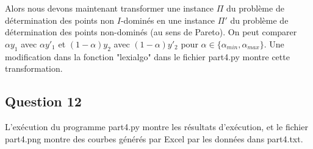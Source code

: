 \documentclass[paper=a4, fontsize=11pt]{scrartcl} %
\numberwithin{equation}{section} %
\numberwithin{figure}{section} %
\numberwithin{table}{section} %
\begin{document}
Alors nous devons maintenant transformer une instance $\Pi$ du probl\`eme de d\'etermination des points non $I$-domin\'es en une instance $\Pi'$ du probl\`eme de d\'etermination des points non-domin\'es (au sens de Pareto). On peut comparer $\alpha y_1$ avec $\alpha y'_1$ et $(1-\alpha)y_2$ avec $(1-\alpha)y'_2$ pour $\alpha\in\{\alpha_{min},\alpha_{max}\}$. Une modification dans la fonction "lexialgo" dans le fichier part4.py montre cette transformation.

\subsection{Question 12}
L'ex\'ecution du programme part4.py montre les r\'esultats d'ex\'ecution, et le fichier part4.png montre des courbes g\'en\'er\'es par Excel par les donn\'ees dans part4.txt.
\end{document}
